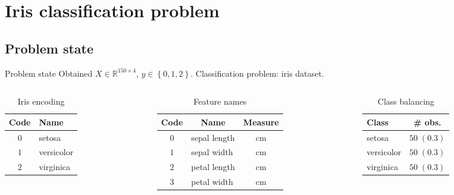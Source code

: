 \documentclass[11pt, aspectratio=169]{beamer}
\newcommand{\emphtext}[1]{\color{black} \textbf{#1}}
\newcommand{\R}{\mathbb{R}}
\begin{document}
    \section{Iris classification problem}
    \subsection{Problem state}
    \begin{frame}[t, allowframebreaks]{Problem state}
    	\noindent Obtained $X \in \R^{150 \times 4}$, $y \in \left\{0, 1, 2\right\}$. Classification problem: iris dataset.
    	\begin{columns}[t]
    		\begin{column}{0.3\textwidth}
    			\begin{table}[t]
    				\begin{tabular}{cl}
    					\toprule
    					\emphtext{Code} & \emphtext{Name}\\
    					\midrule[0.02cm]
    					$0$ & setosa\\[0.385cm]
    					$1$ & versicolor\\[0.385cm]
    					$2$ & virginica\\
    					\midrule[0.02cm]
    				\end{tabular}
    				\caption{Iris encoding}
    			\end{table}
    		\end{column}
    		\begin{column}{0.4\textwidth}
    			\begin{table}[t]
    				\begin{tabular}{clc}
    					\toprule
    					\emphtext{Code} & \multicolumn{1}{c}{\emphtext{Name}} & \emphtext{Measure}\\
    					\midrule[0.02cm]
    					$0$ & sepal length & cm\\[0.1cm]
    					$1$ & sepal width & cm\\[0.1cm]
    					$2$ & petal length & cm\\[0.1cm]
    					$3$ & petal width & cm\\
    					\midrule[0.02cm]
    				\end{tabular}
    				\caption{Feature names}
    			\end{table}
    		\end{column}
    		\begin{column}{0.3\textwidth}
    			\begin{table}[t]
    				\begin{tabular}{lc}
    					\toprule
    					\emphtext{Class} & \emphtext{\# obs.}\\
    					\midrule[0.02cm]
    					setosa & $50 \;(0.3)$\\[0.385cm]
    					versicolor & $50 \;(0.3)$\\[0.385cm]
    					virginica & $50 \;(0.3)$\\
    					\midrule[0.02cm]
    				\end{tabular}
    				\caption{Class balancing}
    			\end{table}
    		\end{column}
    	\end{columns}
    	\framebreak
    	

\end{frame}
\end{document}
